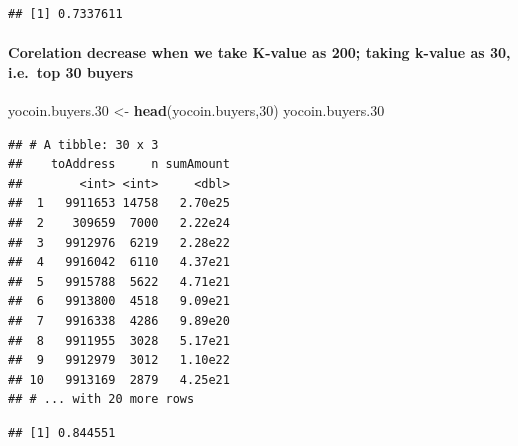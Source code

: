 \documentclass[]{article}
\newenvironment{Shaded}{\begin{snugshade}}{\end{snugshade}}
\newcommand{\KeywordTok}[1]{\textcolor[rgb]{0.13,0.29,0.53}{\textbf{#1}}}
\newcommand{\DecValTok}[1]{\textcolor[rgb]{0.00,0.00,0.81}{#1}}
\newcommand{\StringTok}[1]{\textcolor[rgb]{0.31,0.60,0.02}{#1}}
\newcommand{\OperatorTok}[1]{\textcolor[rgb]{0.81,0.36,0.00}{\textbf{#1}}}
\newcommand{\NormalTok}[1]{#1}
\let\oldparagraph\paragraph
\renewcommand{\paragraph}[1]{\oldparagraph{#1}\mbox{}}
\begin{document}
\begin{Shaded}
\end{Shaded}

\begin{verbatim}
## [1] 0.7337611
\end{verbatim}

\paragraph{Corelation decrease when we take K-value as 200; taking
k-value as 30, i.e.~top 30
buyers}\label{corelation-decrease-when-we-take-k-value-as-200-taking-k-value-as-30-i.e.top-30-buyers}

\begin{Shaded}
\begin{Highlighting}[]
\NormalTok{yocoin.buyers.}\DecValTok{30}\NormalTok{ <-}\StringTok{ }\KeywordTok{head}\NormalTok{(yocoin.buyers,}\DecValTok{30}\NormalTok{)}
\NormalTok{yocoin.buyers.}\DecValTok{30}
\end{Highlighting}
\end{Shaded}

\begin{verbatim}
## # A tibble: 30 x 3
##    toAddress     n sumAmount
##        <int> <int>     <dbl>
##  1   9911653 14758   2.70e25
##  2    309659  7000   2.22e24
##  3   9912976  6219   2.28e22
##  4   9916042  6110   4.37e21
##  5   9915788  5622   4.71e21
##  6   9913800  4518   9.09e21
##  7   9916338  4286   9.89e20
##  8   9911955  3028   5.17e21
##  9   9912979  3012   1.10e22
## 10   9913169  2879   4.25e21
## # ... with 20 more rows
\end{verbatim}

\begin{Shaded}
\end{Shaded}

\begin{verbatim}
## [1] 0.844551
\end{verbatim}
\end{document}
